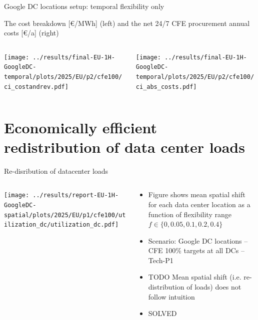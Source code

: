 \begin{frame}{Google DC locations setup: temporal flexibility only}

  \centering

  {\footnotesize
  The cost breakdown [\euro/MWh] (left) and the net 24/7 CFE procurement annual costs [\euro/a] (right)
  }
  \vspace{.5cm}
  
  \begin{columns}
    \begin{column}{8cm}
    \centering
    \texttt{[image: ../results/final-EU-1H-GoogleDC-temporal/plots/2025/EU/p2/cfe100/ci\_costandrev.pdf]}
    \end{column}
    
    \begin{column}{8cm}
      \centering
      \texttt{[image: ../results/final-EU-1H-GoogleDC-temporal/plots/2025/EU/p2/cfe100/ci\_abs\_costs.pdf]}
      \end{column}
    \end{columns}

\end{frame}


\section{Economically efficient redistribution of data center loads}



\begin{frame}{Re-disribution of datacenter loads}

  \begin{columns}[T]
  \begin{column}{6cm}

  \centering
  \texttt{[image: ../results/report-EU-1H-GoogleDC-spatial/plots/2025/EU/p1/cfe100/utilization\_dc/utilization\_dc.pdf]}

  \end{column}

  \begin{column}{7cm}
  {\small
  \begin{itemize}

  \item Figure shows mean spatial shift for each data center location as a function of flexibility range $f \in \{0,0.05,0.1,0.2,0.4\}$ 
  \item Scenario: Google DC locations -- CFE 100\% targets at all DCs -- Tech-P1
  \item \alert{TODO} Mean spatial shift (i.e. re-distribution of loads) does not follow intuition
  \item \alert{SOLVED}

  \end{itemize}
  }

  \end{column}
  \end{columns}

\end{frame}


